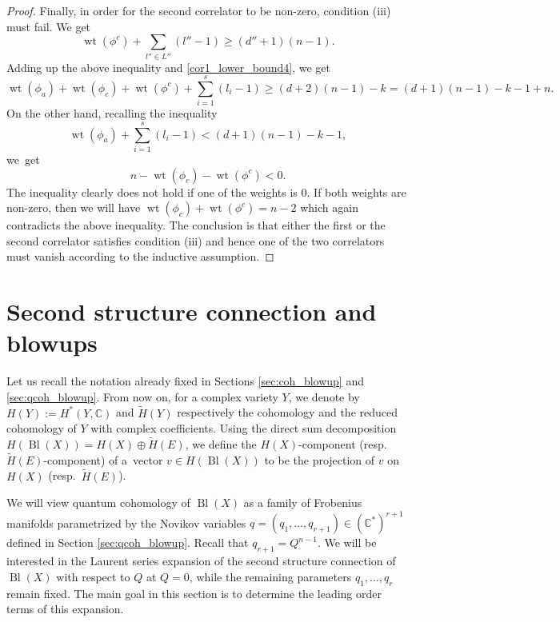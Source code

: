 \documentclass[10pt,a4paper]{article}
\numberwithin{equation}{section}
\newcommand{\CC}{\mathbb{C}}
\begin{document}
\begin{proof}
Finally, in order for the second correlator to be non-zero, condition (iii) must fail. We get
\[
\operatorname{wt}(\phi^c) + \sum_{l''\in L''} (l''-1) \geq (d''+1)(n-1).
\]
Adding up the above inequality and \eqref{cor1_lower_bound4}, we get
\[
\operatorname{wt}(\phi_a) + \operatorname{wt}(\phi_c) + \operatorname{wt}(\phi^c)+
\sum_{i=1}^s (l_i-1) \geq (d+2)(n-1) -k = (d+1)(n-1)-k-1 + n.
\]
On the other hand, recalling the inequality
\[
\operatorname{wt}(\phi_a)+ \sum_{i=1}^s (l_i-1) < (d+1)(n-1)-k-1,
\]
 we~get
\[
n-\operatorname{wt}(\phi_c) - \operatorname{wt}(\phi^c) < 0.
\]
The inequality clearly does not hold if one of the weights is $0$. If both weights are non-zero, then we will have $\operatorname{wt}(\phi_c) + \operatorname{wt}(\phi^c)= n-2$ which again contradicts the above inequality. The conclusion is that either the first or the second correlator satisfies condition (iii) and hence one of the two correlators must vanish according to the inductive assumption.
\end{proof}

\section{Second structure connection and blowups}
\label{sec:2nd_sc_blowups}

Let us recall the notation already fixed in
Sections \ref{sec:coh_blowup} and \ref{sec:qcoh_blowup}. From now on, for a complex variety $Y$, we denote by $H(Y):=H^*(Y,\CC)$
and $\widetilde{H}(Y)$ respectively the cohomology and the reduced
cohomology of $Y$ with complex coefficients. Using the direct sum decomposition~$H(\operatorname{Bl}(X))=H(X)\oplus \widetilde{H}(E)$, we define the $H(X)$-component (resp.\ $\widetilde{H}(E)$-component) of a~vector $v\in H(\operatorname{Bl}(X))$ to be the projection of $v$ on $H(X)$ (resp.\ $\widetilde{H}(E)$).

We will view quantum cohomology of $\operatorname{Bl}(X)$ as a family of
Frobenius manifolds parametrized by the Novikov variables $q=(q_1,\dots,q_{r+1})\in (\CC^*)^{r+1}$ defined in Section \ref{sec:qcoh_blowup}. Recall that ${q_{r+1}=Q^{n-1}}$. We will be
interested in the Laurent series expansion of the second structure
connection of $\operatorname{Bl}(X)$ with respect to $Q$ at $Q=0$, while the
remaining parameters $q_1,\dots, q_r$ remain fixed. The main goal in
this section is to determine the leading order terms of this expansion.
\end{document}
